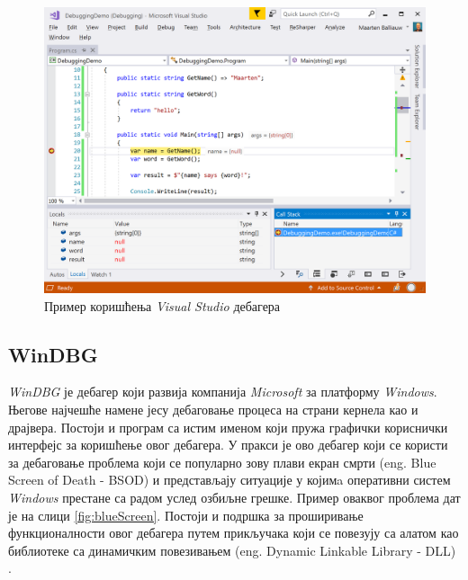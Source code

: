 \documentclass[a4paper]{article}
\begin{document}
\begin{figure}
    \begin{center}
        \includegraphics[width=\textwidth]{slike/msvd.png}
    \end{center}
    \caption{Пример коришћења {\em Visual Studio} дебагера}
    \label{fig:msvd}
\end{figure}

\subsection{WinDBG}

{\em WinDBG} је дебагер који развија компанија {\em Microsoft} 
за платформу {\em Windows}. Његове најчешће намене јесу дебаговање 
процеса на страни кернела као и драјвера. Постоји и програм са истим 
именом који пружа графички кориснички интерфејс за коришћење овог 
дебагера. У пракси је ово дебагер који се користи за дебаговање 
проблема који се популарно зову плави екран смрти (eng. Blue Screen of Death - BSOD)
и представљају ситуације у којимa оперативни систем {\em Windows}
престане са радом услед озбиљне грешке.
Пример оваквог проблема дат је на слици \ref{fig:blueScreen}.
Постоји и подршка за проширивање функционалности овог дебагера 
путем прикључака који се повезују са алатом као библиотеке са 
динамичким повезивањем (eng. Dynamic Linkable Library - DLL) \cite{windbg}.
\end{document}
